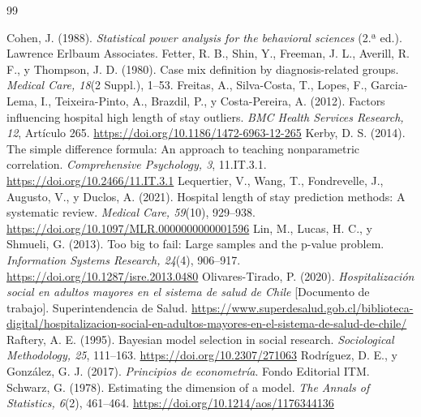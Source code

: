 \documentclass[10.5pt,a4paper,headings=small,abstract=false,bibliography=totoc,listof=totoc]{scrartcl}
\begin{document}
\clearpage
\begin{thebibliography}{99}\small\raggedright\setlength{\itemsep}{0.25em}
 Cohen, J. (1988). \emph{Statistical power analysis for the behavioral sciences} (2.ª ed.). Lawrence Erlbaum Associates.
 Fetter, R. B., Shin, Y., Freeman, J. L., Averill, R. F., y Thompson, J. D. (1980). Case mix definition by diagnosis-related groups. \emph{Medical Care, 18}(2 Suppl.), 1--53.
 Freitas, A., Silva-Costa, T., Lopes, F., Garcia-Lema, I., Teixeira-Pinto, A., Brazdil, P., y Costa-Pereira, A. (2012). Factors influencing hospital high length of stay outliers. \emph{BMC Health Services Research, 12}, Artículo 265. \url{https://doi.org/10.1186/1472-6963-12-265}
 Kerby, D. S. (2014). The simple difference formula: An approach to teaching nonparametric correlation. \emph{Comprehensive Psychology, 3}, 11.IT.3.1. \url{https://doi.org/10.2466/11.IT.3.1}
 Lequertier, V., Wang, T., Fondrevelle, J., Augusto, V., y Duclos, A. (2021). Hospital length of stay prediction methods: A systematic review. \emph{Medical Care, 59}(10), 929--938. \url{https://doi.org/10.1097/MLR.0000000000001596}
 Lin, M., Lucas, H. C., y Shmueli, G. (2013). Too big to fail: Large samples and the p-value problem. \emph{Information Systems Research, 24}(4), 906--917. \url{https://doi.org/10.1287/isre.2013.0480}
 Olivares-Tirado, P. (2020). \emph{Hospitalización social en adultos mayores en el sistema de salud de Chile} [Documento de trabajo]. Superintendencia de Salud. \url{https://www.superdesalud.gob.cl/biblioteca-digital/hospitalizacion-social-en-adultos-mayores-en-el-sistema-de-salud-de-chile/}
 Raftery, A. E. (1995). Bayesian model selection in social research. \emph{Sociological Methodology, 25}, 111--163. \url{https://doi.org/10.2307/271063}
 Rodríguez, D. E., y González, G. J. (2017). \emph{Principios de econometría}. Fondo Editorial ITM.
 Schwarz, G. (1978). Estimating the dimension of a model. \emph{The Annals of Statistics, 6}(2), 461--464. \url{https://doi.org/10.1214/aos/1176344136}
\end{thebibliography}
\end{document}
